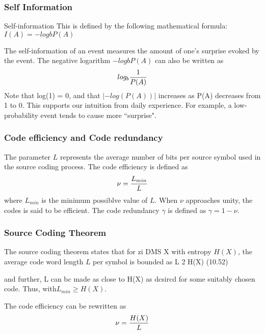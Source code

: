 \documentclass[a4]{beamer}
\begin{document}
\begin{frame} %
\frametitle{Self Information}Self-information
This is defined by the following mathematical formula:$I(A) = −logb P(A)$

The self-information of an event measures the amount of one’s surprise
evoked by the event. The negative logarithm $−logb P(A)$ can also be written as \[
log_b  {1 \over P(A)} \]
Note that log(1) = 0, and that $| − log(P(A))|$ increases as P(A) decreases
from 1 to 0. This supports our intuition from daily experience. For example,
a low-probability event tends to cause more ``surprise".
\end{frame}



\begin{frame}
\frametitle{Code efficiency and Code redundancy}
The parameter $L$ represents the average number of bits per source symbol used in the source coding process.
The code efficiency is defined as \[\nu = {L_{min} \over L} \]where $L_{min}$ is the minimum possiblve value of $L$. When $\nu$ approaches unity, the codes is said to be efficient. 
The code redundancy $\gamma$ is defined as $\gamma = 1- \nu$.
\end{frame}


\begin{frame}
\frametitle{Source Coding Theorem}
The source coding theorem states that for zi DMS X with entropy $H(X)$, the average code word length $L$ per symbol is bounded as
L 2 H(X) (10.52)

and further, L can bc made as close to H(X) as dcsircd for some suitably chosen code.
Thus, with$ L_{min} \geq H(X)$.

The code efficiency can be rewritten as
\[\nu = {H(X) \over L} \]
\end{frame}
\end{document}
